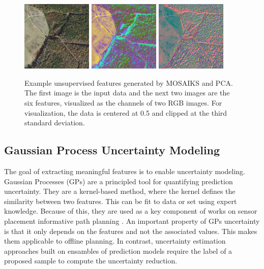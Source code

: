 \begin{figure}
    \centering
    \includegraphics[width=0.3\textwidth]{figs/methods/IPP/img_for_features.png}
    \includegraphics[width=0.3\textwidth]{figs/methods/IPP/first_three_feaures.png}
    \includegraphics[width=0.3\textwidth]{figs/methods/IPP/second_three_features.png}
    \caption{Example unsupervised features generated by MOSAIKS and PCA. The first image is the input data and the next two images are the six features, visualized as the channels of two RGB images. For visualization, the data is centered at 0.5 and clipped at the third standard deviation.}
    \label{fig:methods:unsupervised_features}
\end{figure}

\subsection{Gaussian Process Uncertainty Modeling}
The goal of extracting meaningful features is to enable uncertainty modeling.
Gaussian Processes (GPs) \cite{Rasmussen2004} are a principled tool for quantifying prediction uncertainty. They are a kernel-based method, where the kernel defines the similarity between two features. This can be fit to data or set using expert knowledge. Because of this, they are used as a key component of works on sensor placement \cite{Krause2008Near-optimalStudies} informative path planning \cite{Fernandez2022InformativeAnalysis, Candela2020PlanetaryMapping, Candela2021}. An important property of GPs uncertainty is that it only depends on the features and not the associated values. This makes them applicable to offline planning. In contrast, uncertainty estimation approaches built on ensambles of prediction models require the label of a proposed sample to compute the uncertainty reduction.

